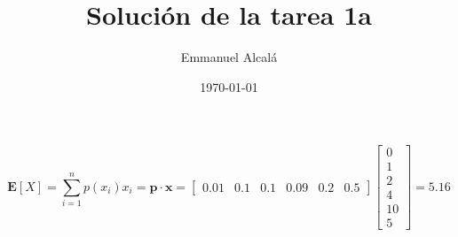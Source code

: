 \documentclass[12pt]{scrartcl} %
\title{Solución de la tarea 1a}
\author{Emmanuel Alcalá}
\date{\today}
\begin{document}
\maketitle


\begin{Exercise}[name={Respuesta}]

  \[\mathbf{E}[X] = \sum_{i=1}^n p(x_i)x_i = \mathbf{p\cdot x} =%
  \begin{bmatrix} 
    0.01 & 0.1 & 0.1 & 0.09 & 0.2 & 0.5
  \end{bmatrix}  
    \begin{bmatrix}
    0 \\ 
    1 \\
    2 \\
    4 \\
    10 \\
    5
    \end{bmatrix} = 5.16 \]

\end{Exercise}
\end{document}
